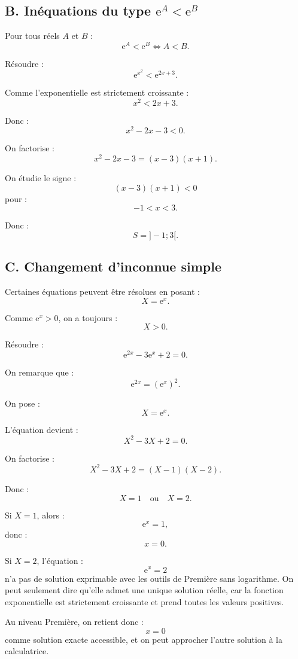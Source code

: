 \documentclass[11pt,a4paper]{article}
\newcommand{\e}{\mathrm{e}}
\begin{document}
\subsection*{B. Inéquations du type $\e^A<\e^B$}

\begin{propriete}
Pour tous réels $A$ et $B$ :
\[
\e^A<\e^B \Longleftrightarrow A<B.
\]
\end{propriete}

\begin{exemplebox}
Résoudre :
\[
\e^{x^2}<\e^{2x+3}.
\]

Comme l'exponentielle est strictement croissante :
\[
x^2<2x+3.
\]

Donc :
\[
x^2-2x-3<0.
\]

On factorise :
\[
x^2-2x-3=(x-3)(x+1).
\]

On étudie le signe :
\[
(x-3)(x+1)<0
\]
pour :
\[
-1<x<3.
\]

Donc :
\[
S=]-1;3[.
\]
\end{exemplebox}

\subsection*{C. Changement d'inconnue simple}

Certaines équations peuvent être résolues en posant :
\[
X=\e^x.
\]

Comme $\e^x>0$, on a toujours :
\[
X>0.
\]

\begin{exemplebox}
Résoudre :
\[
\e^{2x}-3\e^x+2=0.
\]

On remarque que :
\[
\e^{2x}=(\e^x)^2.
\]

On pose :
\[
X=\e^x.
\]

L'équation devient :
\[
X^2-3X+2=0.
\]

On factorise :
\[
X^2-3X+2=(X-1)(X-2).
\]

Donc :
\[
X=1
\quad \text{ou} \quad
X=2.
\]

Si $X=1$, alors :
\[
\e^x=1,
\]
donc :
\[
x=0.
\]

Si $X=2$, l'équation :
\[
\e^x=2
\]
n'a pas de solution exprimable avec les outils de Première sans logarithme. On peut seulement dire qu'elle admet une unique solution réelle, car la fonction exponentielle est strictement croissante et prend toutes les valeurs positives.

Au niveau Première, on retient donc :
\[
x=0
\]
comme solution exacte accessible, et on peut approcher l'autre solution à la calculatrice.
\end{exemplebox}
\end{document}
